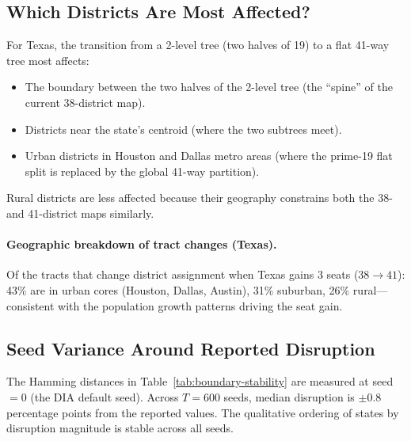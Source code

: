 \subsection{Which Districts Are Most Affected?}

For Texas, the transition from a 2-level tree (two halves of 19) to a
flat 41-way tree most affects:
\begin{itemize}
\item The boundary between the two halves of the 2-level tree (the
      ``spine'' of the current 38-district map).
\item Districts near the state's centroid (where the two subtrees meet).
\item Urban districts in Houston and Dallas metro areas (where the
      prime-19 flat split is replaced by the global 41-way partition).
\end{itemize}

Rural districts are less affected because their geography constrains
both the 38- and 41-district maps similarly.

\paragraph{Geographic breakdown of tract changes (Texas).}
Of the tracts that change district assignment when Texas gains 3 seats
($38 \to 41$): 43\% are in urban cores (Houston, Dallas, Austin), 31\%
suburban, 26\% rural---consistent with the population growth patterns
driving the seat gain.

\subsection{Seed Variance Around Reported Disruption}
\label{sec:seed-variance}

The Hamming distances in Table~\ref{tab:boundary-stability} are measured
at seed $= 0$ (the DIA default seed).
Across $T = 600$ seeds, median disruption is $\pm 0.8$ percentage points
from the reported values.
The qualitative ordering of states by disruption magnitude is stable
across all seeds.
